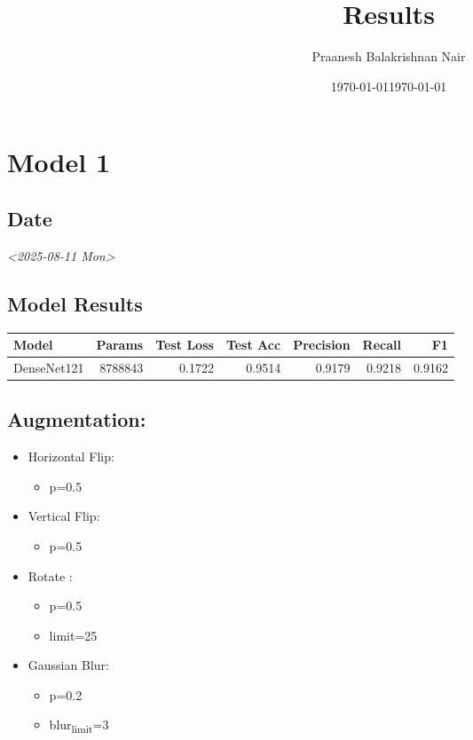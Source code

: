 \documentclass[11pt]{article}
\title{\thetitle}
\author{\theauthor}
\date{\today}
\author{Praanesh Balakrishnan Nair}
\date{\today}
\title{Results}
\begin{document}
\maketitle
\section{Model 1}
\label{sec:orgf16a581}

\subsection{Date}
\label{sec:org73b961d}
\textit{<2025-08-11 Mon>}
\subsection{Model Results}
\label{sec:org77aae0f}

\begin{center}
\begin{tabular}{lrrrrrr}
Model & Params & Test Loss & Test Acc & Precision & Recall & F1\\
\hline
DenseNet121 & 8788843 & 0.1722 & 0.9514 & 0.9179 & 0.9218 & 0.9162\\
\end{tabular}
\end{center}
\subsection{Augmentation:}
\label{sec:orgda80b66}

\begin{itemize}
\item Horizontal Flip:
\begin{itemize}
\item p=0.5
\end{itemize}
\item Vertical Flip:
\begin{itemize}
\item p=0.5
\end{itemize}
\item Rotate :
\begin{itemize}
\item p=0.5
\item limit=25
\end{itemize}
\item Gaussian Blur:
\begin{itemize}
\item p=0.2
\item blur\textsubscript{limit}=3
\end{itemize}
\end{itemize}
\end{document}
